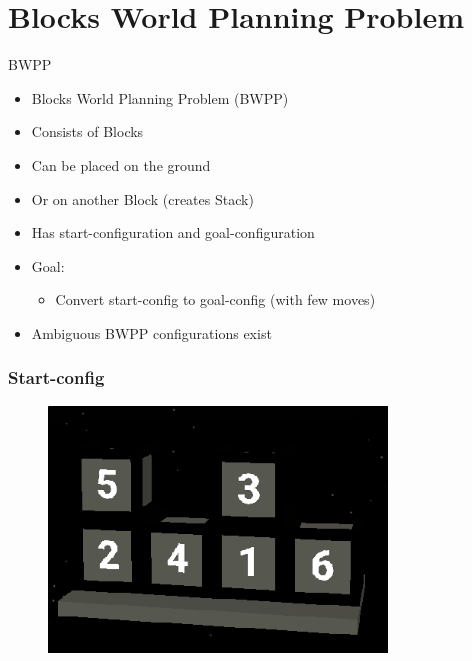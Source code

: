 \documentclass[12pt]{beamer}
\begin{document}
    \section{Blocks World Planning Problem}
        \begin{frame}[fragile]{BWPP}
           \begin{itemize}
               \item Blocks World Planning Problem (BWPP)
               \item Consists of Blocks
               \item Can be placed on the ground
               \item Or on another Block (creates Stack)
               \item Has start-configuration and goal-configuration
               \item Goal:
               \begin{itemize}
                   \item Convert start-config to goal-config (with few moves)
               \end{itemize}
                \item Ambiguous BWPP configurations exist
           \end{itemize} 
        \end{frame}

        \begin{frame}[fragile]
            \frametitle{Start-config}
            \begin{figure}
                \includegraphics[width=9cm]{start_config.png}
            \end{figure} 
        \end{frame}
        
\end{document}
